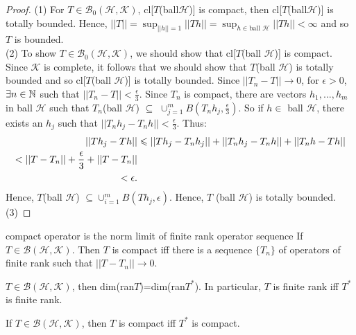 \begin{proof}
    (1) For $T\in\mathscr{B}_0(\mathscr{H},\mathscr{K})$,
    cl[$T$(ball$\mathscr{H}$)] is compact, then cl[$T$(ball$\mathscr{H}$)] is totally bounded.
    Hence, $||T||=\sup_{||h||=1}||Th||=\sup_{h\in \text{ball }\mathscr{H} }||Th||<\infty$ and so $T$ is bounded. \\
    (2) To show $T\in\mathscr{B}_0(\mathscr{H},\mathscr{K})$, we should show that cl[$T$(ball $\mathscr{H}$)] is compact.
    Since $\mathscr{K}$ is complete, it follows that we should show that $T$(ball $\mathscr{H}$) is totally bounded and so cl[$T$(ball $\mathscr{H}$)] is totally bounded.
    Since $||T_n-T||\rightarrow 0$, for $\epsilon>0$, $\exists n\in\mathbb{N}$ such that $||T_n-T||<\frac{\epsilon}{3}$.
    Since $T_n$ is compact, there are vectors $h_1,...,h_m$ in ball $\mathscr{H}$
    such that $T_n$(ball $\mathscr{H}$) $\subseteq$ $\cup_{j=1}^{m} B(T_nh_j,\frac{\epsilon}{3})$.
    So if $h\in$ ball $\mathscr{H}$, there exists an $h_j$ such that $||T_nh_j-T_nh||<\frac{\epsilon}{3}$. Thus:
    \begin{align*}
        ||Th_j-Th||&\leqslant ||Th_j-T_nh_j||+||T_nh_j-T_nh||+||T_nh-Th||\\
                  < ||T-T_n||+\frac{\epsilon}{3} + ||T-T_n||\\
                  < \epsilon.
    \end{align*}
    Hence, $T$(ball $\mathscr{H}$) $\subseteq \cup_{i=1}^{m} B(Th_j,\epsilon)$. Hence, $T$ (ball $\mathscr{H}$) is totally bounded.\\
    (3)
\end{proof}

\begin{proposition}{}{compact operator is the norm limit of finite rank operator sequence}
    If $T\in \mathscr{B}(\mathscr{H},\mathscr{K})$. Then 
    $T$ is compact iff there is a sequence $\{T_n\}$ of operators of finite rank such that $||T-T_n||\rightarrow 0$.
\end{proposition}

\begin{lemma}{}{}
    $T\in \mathscr{B}(\mathscr{H},\mathscr{K})$, 
    then dim(ran$T$)=dim(ran$T^*$). In particular, $T$ is finite rank iff $T^*$ is finite rank.
\end{lemma}

\begin{proposition}{}{}
    If $T\in\mathscr{B}(\mathscr{H},\mathscr{K})$, then $T$ is compact iff $T^*$ is compact.
\end{proposition}

